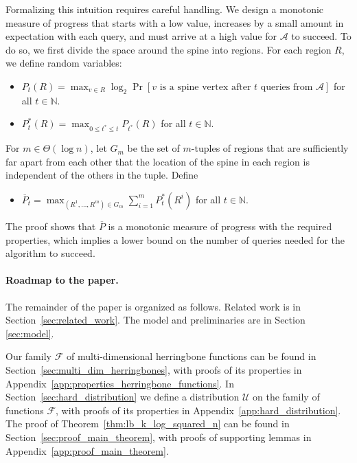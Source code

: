 \documentclass[11pt]{article}
\begin{document}
Formalizing this intuition requires careful handling. We design  a monotonic measure of progress that starts with a low value, increases by a small amount in expectation with each query, and must arrive at a high value for $\mathcal{A}$ to succeed. To do so, we first divide the space around the spine into regions. For each region $R$, we define random variables:
\begin{itemize}
\item $ P_t(R) = \max_{v \in R} \log_2 \Pr \left[\text{$v$ is a spine vertex after $t$ queries from $\mathcal{A}$}\right] $ for all $t \in \mathbb{N}$. 
\item $    P^*_t(R) = \max_{0 \leq t^* \leq t} P_{t^*}(R)  $ for all $t \in \mathbb{N}$. 
\end{itemize}
For $m \in \Theta(\log n)$, let $G_m$ be the set of $m$-tuples of regions that are sufficiently far apart from each other that the location of the spine in each region is independent of the others in the tuple.
Define %
\begin{itemize} 
\item $ \overline{P}_t = \max_{(R^1, \ldots, R^m) \in G_m} \sum_{i=1}^m P^*_t(R^i) $ for all $t \in \mathbb{N}$. %
\end{itemize}
The proof  shows that $\overline{P}$ is a monotonic measure of progress  with the required properties, which implies a lower bound on the number of queries needed for the algorithm to succeed. 

\vspace{-2mm}
\paragraph{Roadmap to the paper.} The remainder of the paper is organized as follows. Related work is in Section~\ref{sec:related_work}. The model and preliminaries are in Section \ref{sec:model}. 

Our family $\mathcal{F}$ of multi-dimensional herringbone functions can be found in Section~\ref{sec:multi_dim_herringbones}, with proofs of its properties in Appendix~\ref{app:properties_herringbone_functions}. 
In Section~\ref{sec:hard_distribution} we define a  distribution $\mathcal{U}$ on the family  of functions  $\mathcal{F}$, with proofs of its properties in Appendix~\ref{app:hard_distribution}.  The proof of Theorem~\ref{thm:lb_k_log_squared_n} can be found in Section~\ref{sec:proof_main_theorem}, with proofs of supporting lemmas in Appendix~\ref{app:proof_main_theorem}. 
\end{document}
